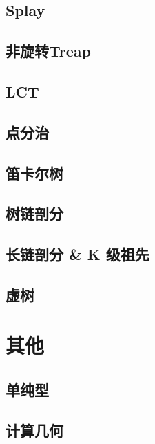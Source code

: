 \documentclass[a4paper,12pt]{article}
\begin{document}
\subsection{Splay}

\subsection{非旋转Treap}

\subsection{LCT}


\subsection{点分治}

\subsection{笛卡尔树}

\subsection{树链剖分}

\subsection{长链剖分 \& K 级祖先}

\subsection{虚树}


\section{其他}

\subsection{单纯型}

\subsection{计算几何}

\end{document}
